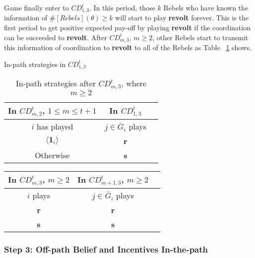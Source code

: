 \documentclass[12pt,letter]{article}
\theoremstyle{definition}
\theoremstyle{remark}
\theoremstyle{claim}
\begin{document}
Game finally enter to $CD^t_{1,3}$. In this period, those $k$ Rebels who have known the information of $\#[Rebels](\theta)\geq k$ will start to play \textbf{revolt} forever. This is the first period to get positive expected pay-off by playing \textbf{revolt} if the coordination can be succeeded to \textbf{revolt}. After $CD^t_{m,3}$, $m\geq 2$, other Rebels start to transmit this information of coordination to \textbf{revolt} to all of the Rebels as Table ~\ref{Table_stg_cdm3} shows.

\begin{table}[t]
\caption{In-path strategies in $CD^t_{1,3}$}
\label{Table_stg_cd13}
\begin{center}
\begin{tabular}{c c c}
In $CD^t_{m,2}$, $1\leq m\leq t+1$ 	 	&  	In $CD^t_{1,3}$		& 	\\
\hline
\hline
$i$ has played 		  							&  $j\in \bar{G}_{i}$ plays  								& \\
\hline
$\langle \mathbf{1}_i \rangle$ 	& 	\textbf{r}	    &  \\
Otherwise		&  \textbf{s}	&  \\

\end{tabular}
\caption{In-path strategies after $CD^t_{m,3}$, where $m\geq 2$}
\label{Table_stg_cdm3}
\end{center}
\end{table}

\begin{table}[t]
\begin{center}
\begin{tabular}{c c c}
In $CD^t_{m,3}$, $m\geq 2$ 	 	&  	In $CD^t_{m+1,3}$, $m\geq 2$		& 	\\
\hline
\hline
$i$ plays 		  							&  $j\in \bar{G}_{i}$ plays  								& \\
\hline
\textbf{r} 	& 	\textbf{r}	    &  \\
\textbf{s}		&  \textbf{s}	&  \\

\end{tabular}
\end{center}
\end{table}



\subsubsection{Step 3: Off-path Belief and Incentives In-the-path}
\end{document}
